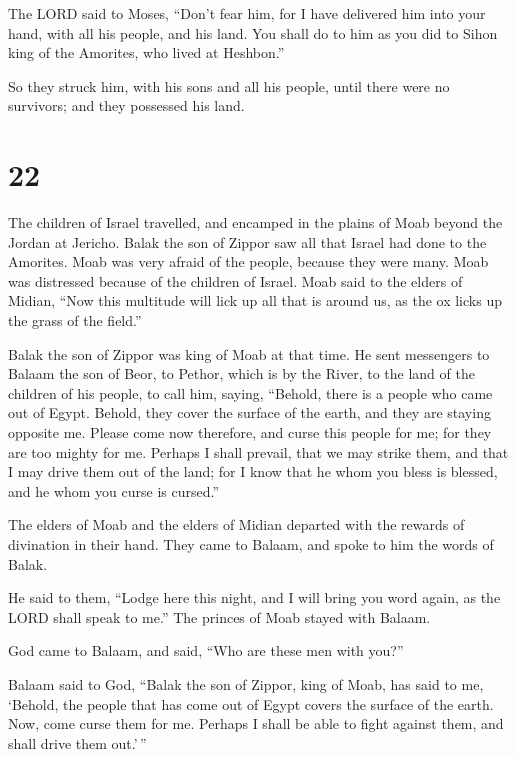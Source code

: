  The LORD said to Moses, ``Don't fear him, for I have
delivered him into your hand, with all his people, and his land. You
shall do to him as you did to Sihon king of the Amorites, who lived at
Heshbon.''

 So they struck him, with his sons and all his people,
until there were no survivors; and they possessed his land.

\hypertarget{section-21}{%
\section{22}\label{section-21}}

 The children of Israel travelled, and encamped in the
plains of Moab beyond the Jordan at Jericho.  Balak the
son of Zippor saw all that Israel had done to the Amorites.
 Moab was very afraid of the people, because they were
many. Moab was distressed because of the children of Israel.
 Moab said to the elders of Midian, ``Now this multitude
will lick up all that is around us, as the ox licks up the grass of the
field.''

Balak the son of Zippor was king of Moab at that time.  He
sent messengers to Balaam the son of Beor, to Pethor, which is by the
River, to the land of the children of his people, to call him, saying,
``Behold, there is a people who came out of Egypt. Behold, they cover
the surface of the earth, and they are staying opposite me.
 Please come now therefore, and curse this people for me;
for they are too mighty for me. Perhaps I shall prevail, that we may
strike them, and that I may drive them out of the land; for I know that
he whom you bless is blessed, and he whom you curse is cursed.''

 The elders of Moab and the elders of Midian departed with
the rewards of divination in their hand. They came to Balaam, and spoke
to him the words of Balak.

 He said to them, ``Lodge here this night, and I will
bring you word again, as the LORD shall speak to me.'' The princes of
Moab stayed with Balaam.

 God came to Balaam, and said, ``Who are these men with
you?''

 Balaam said to God, ``Balak the son of Zippor, king of
Moab, has said to me,  `Behold, the people that has come
out of Egypt covers the surface of the earth. Now, come curse them for
me. Perhaps I shall be able to fight against them, and shall drive them
out.'\,''

